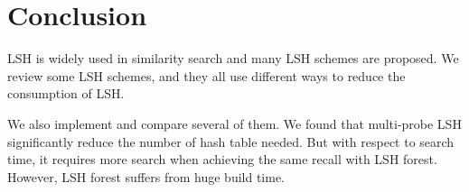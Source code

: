 \section{Conclusion}

LSH is widely used in similarity search and many LSH schemes are proposed.
We review some LSH schemes, and they all use different ways to reduce the consumption of LSH.

We also implement and compare several of them.
We found that multi-probe LSH significantly reduce the number of hash table needed.
But with respect to search time, it requires more search when achieving the same recall with LSH forest.
However, LSH forest suffers from huge build time.